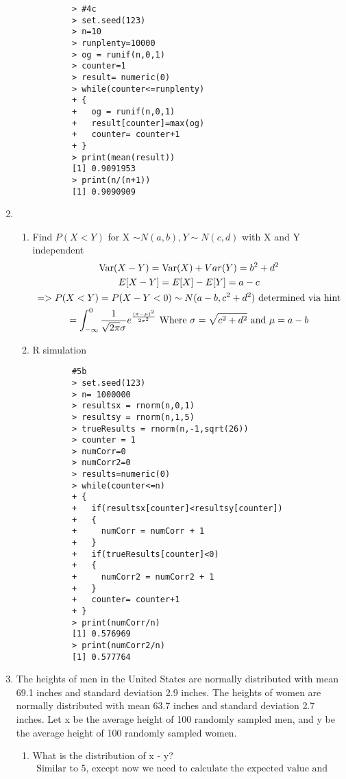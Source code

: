 \documentclass[11pt]{article}
\newcommand{\Var}{\mathop{\rm Var}}
\begin{document}
\begin{enumerate}
\begin{enumerate}
\begin{verbatim}
		> #4c
		> set.seed(123)
		> n=10
		> runplenty=10000
		> og = runif(n,0,1)
		> counter=1
		> result= numeric(0)
		> while(counter<=runplenty)
		+ {
		+   og = runif(n,0,1)
		+   result[counter]=max(og)
		+   counter= counter+1
		+ }
		> print(mean(result))
		[1] 0.9091953
		> print(n/(n+1))
		[1] 0.9090909
	\end{verbatim}
\end{enumerate}
\item 
\begin{enumerate}
	\item Find $P(X < Y)$ for X $\sim N(a, b), Y \sim N(c, d)$ with X and Y independent
	\begin{gather}
	\Var(X-Y) = \Var(X) + Var(Y) = b^2 + d^2\\
	E[X-Y] = E[X] - E[Y] = a - c\\
	=>	P(X<Y) = P(X-Y < 0) \sim N(a-b,c^2 + d^2) \text{ determined via hint}\\
		= \int_{-\infty}^{0} \frac{1}{\sqrt{2\pi} \sigma} e ^ {\frac{(x-\mu)^2}{2\sigma ^2}} \text{ Where } \sigma = \sqrt{c^2 + d^2} \text{ and } \mu = a-b
	\end{gather}
	\item R simulation
	\begin{verbatim}
		#5b
		> set.seed(123)
		> n= 1000000
		> resultsx = rnorm(n,0,1)
		> resultsy = rnorm(n,1,5)
		> trueResults = rnorm(n,-1,sqrt(26))
		> counter = 1
		> numCorr=0
		> numCorr2=0
		> results=numeric(0) 
		> while(counter<=n)
		+ {
		+   if(resultsx[counter]<resultsy[counter])
		+   {
		+     numCorr = numCorr + 1
		+   }
		+   if(trueResults[counter]<0)
		+   {
		+     numCorr2 = numCorr2 + 1
		+   }
		+   counter= counter+1
		+ }
		> print(numCorr/n)
		[1] 0.576969
		> print(numCorr2/n)
		[1] 0.577764
	\end{verbatim}
\end{enumerate}
\item The heights of men in the United States are normally distributed with mean 69.1 inches and standard deviation
2.9 inches. The heights of women are normally distributed with mean 63.7 inches and standard deviation 2.7 inches. Let x be the average height of 100 randomly sampled men, and y be the average height
of 100 randomly sampled women.
\begin{enumerate}
	\item What is the distribution of x - y?
	\begin{gather}
		\text{Similar to 5, except now we need to calculate the expected value and variance over the 100 samples}\\

\end{gather}
\end{enumerate}
\end{enumerate}
\end{document}
